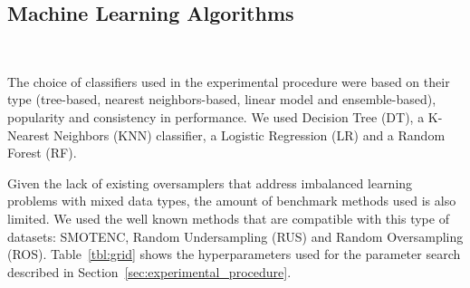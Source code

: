 \documentclass[parskip=full]{scrartcl}
\begin{document}
\subsection{Machine Learning Algorithms}~\label{sec:ml_algorithms}

The choice of classifiers used in the experimental procedure were based on
their type (tree-based, nearest neighbors-based, linear model and
ensemble-based), popularity and consistency in performance. We used Decision
Tree (DT), a K-Nearest Neighbors (KNN) classifier, a Logistic
Regression (LR) and a Random Forest (RF).

Given the lack of existing oversamplers that address imbalanced learning
problems with mixed data types, the amount of benchmark methods used is also
limited. We used the well known methods that are compatible with this type of
datasets: SMOTENC, Random Undersampling (RUS) and Random Oversampling (ROS).
Table~\ref{tbl:grid} shows the hyperparameters used for the parameter search
described in Section~\ref{sec:experimental_procedure}.
\end{document}

